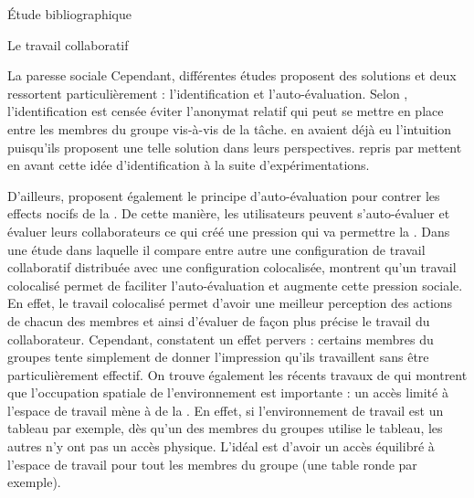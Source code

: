 \documentclass[myfrancais,ngerman,english,frenchb]{mythesis}
\begin{document}
\begin{mychapter}{Étude bibliographique}
\begin{mysection}{Le travail collaboratif}
\begin{mysubsection}{La paresse sociale}
				Cependant, différentes études proposent des solutions et deux ressortent particulièrement : l'identification et l'auto-évaluation.
				Selon , l'identification est censée éviter l'anonymat relatif qui peut se mettre en place entre les membres du groupe vis-à-vis de la tâche.
				 en avaient déjà eu l'intuition puisqu'ils proposent une telle solution dans leurs perspectives.
				 repris par  mettent en avant cette idée d'identification à la suite d'expérimentations.

				D'ailleurs,  proposent également le principe d'auto-évaluation pour contrer les effects nocifs de la .
				De cette manière, les utilisateurs peuvent s'auto-évaluer et évaluer leurs collaborateurs ce qui créé une pression qui va permettre la  .
				Dans une étude dans laquelle il compare entre autre une configuration de travail collaboratif distribuée avec une configuration colocalisée,  montrent qu'un travail colocalisé permet de faciliter l'auto-évaluation et augmente cette pression sociale.
				En effet, le travail colocalisé permet d'avoir une meilleur perception des actions de chacun des membres et ainsi d'évaluer de façon plus précise le travail du collaborateur.
				Cependant,  constatent un effet pervers : certains membres du groupes tente simplement de donner l'impression qu'ils travaillent sans être particulièrement effectif.
				On trouve également les récents travaux de  qui montrent que l'occupation spatiale de l'environnement est importante : un accès limité à l'espace de travail mène à de la .
				En effet, si l'environnement de travail est un tableau par exemple, dès qu'un des membres du groupes utilise le tableau, les autres n'y ont pas un accès physique.
				L'idéal est d'avoir un accès équilibré à l'espace de travail pour tout les membres du groupe (une table ronde par exemple).


\end{mysubsection}
\end{mysection}
\end{mychapter}
\end{document}
